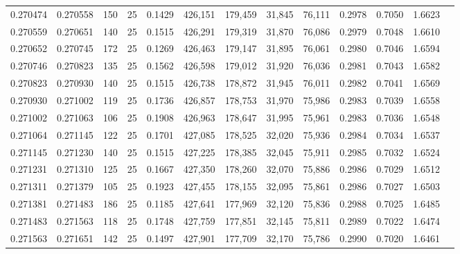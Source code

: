 \begin{tabular}{rrrrrrrrrrrrr}
0.270474 & 0.270558 &   150 &  25 &                                     0.1429 & 426,151 & 179,459 &  31,845 &  76,111 & 0.2978 & 0.7050 & 1.6623 \\
0.270559 & 0.270651 &   140 &  25 &                                     0.1515 & 426,291 & 179,319 &  31,870 &  76,086 & 0.2979 & 0.7048 & 1.6610 \\
0.270652 & 0.270745 &   172 &  25 &                                     0.1269 & 426,463 & 179,147 &  31,895 &  76,061 & 0.2980 & 0.7046 & 1.6594 \\
0.270746 & 0.270823 &   135 &  25 &                                     0.1562 & 426,598 & 179,012 &  31,920 &  76,036 & 0.2981 & 0.7043 & 1.6582 \\
0.270823 & 0.270930 &   140 &  25 &                                     0.1515 & 426,738 & 178,872 &  31,945 &  76,011 & 0.2982 & 0.7041 & 1.6569 \\
0.270930 & 0.271002 &   119 &  25 &                                     0.1736 & 426,857 & 178,753 &  31,970 &  75,986 & 0.2983 & 0.7039 & 1.6558 \\
0.271002 & 0.271063 &   106 &  25 &                                     0.1908 & 426,963 & 178,647 &  31,995 &  75,961 & 0.2983 & 0.7036 & 1.6548 \\
0.271064 & 0.271145 &   122 &  25 &                                     0.1701 & 427,085 & 178,525 &  32,020 &  75,936 & 0.2984 & 0.7034 & 1.6537 \\
0.271145 & 0.271230 &   140 &  25 &                                     0.1515 & 427,225 & 178,385 &  32,045 &  75,911 & 0.2985 & 0.7032 & 1.6524 \\
0.271231 & 0.271310 &   125 &  25 &                                     0.1667 & 427,350 & 178,260 &  32,070 &  75,886 & 0.2986 & 0.7029 & 1.6512 \\
0.271311 & 0.271379 &   105 &  25 &                                     0.1923 & 427,455 & 178,155 &  32,095 &  75,861 & 0.2986 & 0.7027 & 1.6503 \\
0.271381 & 0.271483 &   186 &  25 &                                     0.1185 & 427,641 & 177,969 &  32,120 &  75,836 & 0.2988 & 0.7025 & 1.6485 \\
0.271483 & 0.271563 &   118 &  25 &                                     0.1748 & 427,759 & 177,851 &  32,145 &  75,811 & 0.2989 & 0.7022 & 1.6474 \\
0.271563 & 0.271651 &   142 &  25 &                                     0.1497 & 427,901 & 177,709 &  32,170 &  75,786 & 0.2990 & 0.7020 & 1.6461 \\

\end{tabular}
